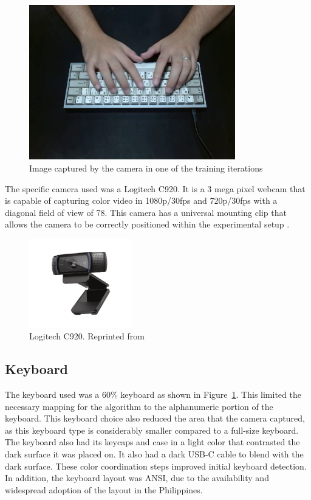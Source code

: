 \documentclass{report}
\begin{document}
\begin{figure}[H]
	\centering
	\includegraphics[width=0.8\textwidth]{actual-keeb.png}
	\caption{Image captured by the camera in one of the training iterations}
	\label{fig:metho-setup-keeb}
\end{figure}

The specific camera used was a Logitech C920. It is a 3 mega pixel webcam that
is capable of capturing color video in 1080p/30fps and 720p/30fps with a
diagonal field of view of 78\degree. This camera has a universal mounting clip
that allows the camera to be correctly positioned within the experimental setup
\parencite{logitech}.

\begin{figure}[H]
	\centering
	\includegraphics[width=0.4\textwidth]{webcam.png}
	\caption{Logitech C920. Reprinted from }
	\label{fig:metho-setup-cam}
	\centering
\end{figure}

\subsection{Keyboard}
\label{section:metho-keeb}

The keyboard used was a 60\% keyboard as shown in
Figure~\ref{fig:metho-setup-keeb}. This limited the necessary mapping for the
algorithm to the alphanumeric portion of the keyboard. This keyboard choice also
reduced the area that the camera captured, as this keyboard type is considerably
smaller compared to a full-size keyboard. The keyboard also had its keycaps and
case in a light color that contrasted the dark surface it was placed on. It also
had a dark USB-C cable to blend with the dark surface. These color coordination
steps improved initial keyboard detection. In addition, the keyboard layout was
ANSI, due to the availability and widespread adoption of the layout in the
Philippines.
\end{document}
